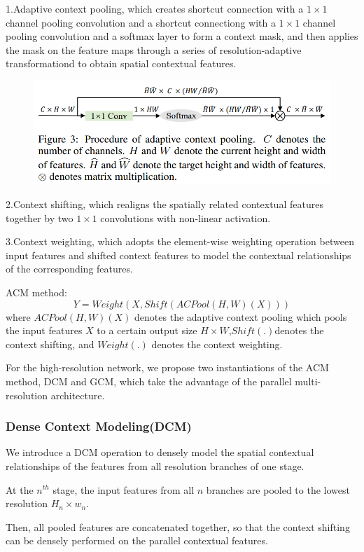 \documentclass[11pt]{article}
\begin{document}
1.Adaptive context pooling, which creates shortcut connection with a $1\times 1$ channel pooling convolution and a shortcut connectiong with a $1\times 1$ channel pooling convolution and a softmax layer to form a context mask, and then applies the mask on the feature maps through a series of resolution-adaptive transformationd to obtain spatial contextual features.
\begin{figure}[H]
	\centering
	\includegraphics[scale=0.5]{98}
\end{figure}

2.Context shifting, which realigns the spatially related contextual features together by two $1\times 1$ convolutions with non-linear activation.

3.Context weighting, which adopts the element-wise weighting operation between input features and shifted context features to model the contextual relationships of the corresponding features.

ACM method:
$$Y = Weight(X, Shift(ACPool(H,W)(X)))$$
where $ACPool(H,W)(X)$ denotes the adaptive context pooling which pools the input features $X$ to a certain output size $H\times W$,$Shift(.)$denotes the context shifting, and $Weight(.)$ denotes the context weighting.

For the high-resolution network, we propose two instantiations of the ACM method, DCM and GCM, which take the advantage of the parallel multi-resolution architecture.
\subsubsection{Dense Context Modeling(DCM)}
We introduce a DCM operation to densely model the spatial contextual relationships of the features from all resolution branches of one stage.

At the $n^{th}$ stage, the input features from all $n$ branches are pooled to the lowest resolution $H_n\times w_n$.

Then, all pooled features are concatenated together, so that the context shifting can be densely performed on the parallel contextual features.
\end{document}
